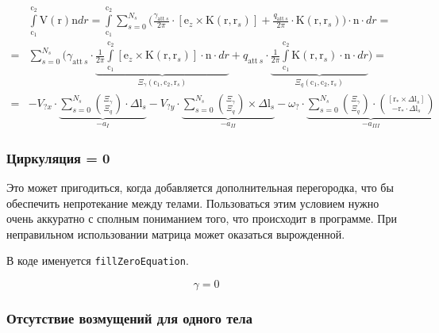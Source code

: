 \documentclass[14pt]{extreport}
\newcommand{\br}[1]{\boldsymbol{\mathrm{#1}}}
\renewcommand{\vec}[1]{\br{#1}}
\newcommand{\att}{\text{att}}
\begin{document}
\begin{equation}
\begin{split}
&\int\limits_{\vec c_1}^{\vec c_2} {\vec V(\vec r)\vec n dr}
= \int\limits_{\vec c_1}^{\vec c_2} {
	\sum\limits_{s=0}^{N_s} {
		\biggl (
		\frac{\gamma_{\att~s}}{2\pi} \cdot [\vec e_z \times \vec K(\vec r, \vec r_s)] +
		\frac{q_{\att~s}}{2\pi} \cdot \vec K(\vec r, \vec r_s)
		\biggr )
	}
	\cdot \vec n \cdot  dr
} = \\ =
&\sum\limits_{s=0}^{N_s} {
	\biggl (
	\gamma_{\att~s} \cdot 
	\underbrace{
	\frac{1}{2\pi}
	\int\limits_{\vec c_1}^{\vec c_2} {
		[\vec e_z \times \vec K(\vec r, \vec r_s)] \cdot \vec n \cdot dr
	}}_{\Xi_\gamma(\vec c_1, \vec c_2, \vec r_s)} + 
	q_{\att~s} \cdot
	\underbrace{
	\frac{1}{2\pi}
	\int\limits_{\vec c_1}^{\vec c_2} {
		\vec K(\vec r, \vec r_s) \cdot \vec n \cdot dr
	}}_{\Xi_q(\vec c_1, \vec c_2, \vec r_s)}
	\biggr )
} = \\ =
&-V_{?x} \cdot \underbrace{
	\sum\limits_{s=0}^{N_s} {\binom{\Xi_\gamma}{\Xi_q} \cdot \Delta \vec l_s}
}_{-a_I}
-V_{?y} \cdot \underbrace{
	\sum\limits_{s=0}^{N_s} {\binom{\Xi_\gamma}{\Xi_q} \times \Delta \vec l_s}
}_{-a_{II}}
-\omega_? \cdot \underbrace{
	\sum\limits_{s=0}^{N_s} {\binom{\Xi_\gamma}{\Xi_q} \cdot \binom{[\vec r_* \times \Delta \vec l_s]}{-\vec r_* \cdot \Delta \vec l_s}}
}_{-a_{III}}
\end{split}
\end{equation}

\subsubsection{Циркуляция = 0}
\label{slau_zero}

Это может пригодиться, когда добавляется дополнительная перегородка, что бы обеспечить непротекание между телами.
Пользоваться этим условием нужно очень аккуратно с сполным пониманием того, что происходит в программе. При неправильном использовании матрица может оказаться вырожденной.

В коде именуется \texttt{fillZeroEquation}.

\begin{equation}
\gamma = 0
\end{equation}

\subsubsection{Отсутствие возмущений для одного тела}
\label{slau_steady}
\end{document}
